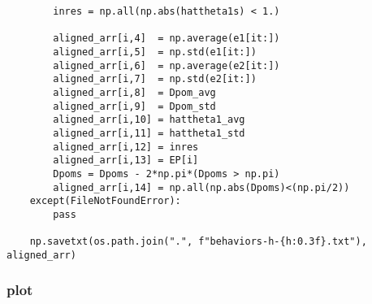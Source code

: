 \documentclass[11pt]{article}
\begin{document}
\begin{verbatim}
	    inres = np.all(np.abs(hattheta1s) < 1.)

	    aligned_arr[i,4]  = np.average(e1[it:])
	    aligned_arr[i,5]  = np.std(e1[it:])
	    aligned_arr[i,6]  = np.average(e2[it:])
	    aligned_arr[i,7]  = np.std(e2[it:])
	    aligned_arr[i,8]  = Dpom_avg
	    aligned_arr[i,9]  = Dpom_std
	    aligned_arr[i,10] = hattheta1_avg
	    aligned_arr[i,11] = hattheta1_std
	    aligned_arr[i,12] = inres
	    aligned_arr[i,13] = EP[i]
	    Dpoms = Dpoms - 2*np.pi*(Dpoms > np.pi)
	    aligned_arr[i,14] = np.all(np.abs(Dpoms)<(np.pi/2))
	except(FileNotFoundError):
	    pass

    np.savetxt(os.path.join(".", f"behaviors-h-{h:0.3f}.txt"), aligned_arr)
\end{verbatim}

\subsubsection{plot}
\label{sec:orgcac96a5}
\end{document}
